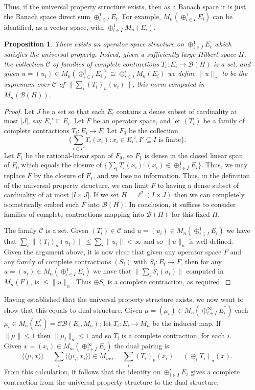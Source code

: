 \documentclass[a4paper,11pt]{article}
\theoremstyle{plain}
\newtheorem{proposition}{Proposition}[section]
\theoremstyle{definition}
\newcommand{\mc}[1]{\mathcal{#1}}
\newcommand{\osip}[2]{\langle\langle{#1},{#2}\rangle\rangle}
\begin{document}
Thus, if the universal property structure exists, then as a Banach space it is just
the Banach space direct sum $\oplus_{i\in I}^1 E_i$.  For example, $M_n(\oplus_{i\in I}^1 E_i)$
can be identified, as a vector space, with $\oplus_{i\in I}^1 M_n(E_i)$.

\begin{proposition}
There exists an operator space structure on $\oplus_{i\in I}^1 E_i$ which satisfies the
universal property.  Indeed, given a sufficiently large Hilbert space $H$, the collection
$\mc C$ of families of complete contractions $T_i:E_i\rightarrow\mc B(H)$ is a set, and
given $u = (u_i) \in M_n(\oplus_{i\in I}^1 E_i) \cong \oplus_{i\in I}^i M_n(E_i)$
we define $\|u\|_n$ to be the supremum over $\mc C$ of $\|\sum_i (T_i)_n(u_i)\|$,
this norm computed in $M_n(\mc B(H))$.
\end{proposition}
\begin{proof}
Let $J$ be a set so that each $E_i$ contains a dense subset of cardinality at most $|J|$,
say $E_i'\subseteq E_i$.
Let $F$ be an operator space, and let $(T_i)$ be a family of complete contractions
$T_i:E_i\rightarrow F$.  Let $F_0$ be the collection
\[ \Big\{ \sum_{i\in I'} T_i(x_i) : x_i\in E_i', I'\subseteq I\text{ is finite} \Big\}. \]
Let $F_1$ be the rational-linear span of $F_0$, so $F_1$ is dense in the closed linear
span of $F_0$ which equals the closure of $\{ \sum_i T_i(x_i) : (x_i)\in \oplus_{i\in I}^1 E_i\}$.  Thus, we may replace $F$ by the closure of $F_1$, and we lose no information.
Thus, in the definition of the universal property
structure, we can limit $F$ to having a dense subset of cardinality of at most $|I\times J|$. 
If we set $H = \ell^2(I\times J)$ then we can completely isometrically embed such $F$ into
$\mc B(H)$.  In conclusion, it suffices to consider families of complete contractions mapping
into $\mc B(H)$ for this fixed $H$.

The family $\mc C$ is a set.  Given $(T_i)\in\mc C$ and $u=(u_i)\in M_n(\oplus_{i\in I}^1 E_i)$
we have that $\sum_i \|(T_i)_n(u_i)\| \leq \sum_i \|u_i\| < \infty$ and so $\|u\|_n$ is
well-defined.  Given the argument above, it is now clear that given any operator space $F$
and any family of complete contractions $(S_i)$ with $S_i:E_i\rightarrow F$, then for any
$u=(u_i)\in M_n(\oplus_{i\in I}^1 E_i)$ we have that $\| \sum_i S_i(u_i) \|$ computed in
$M_n(F)$, is $\leq \|u\|_n$.  Thus $\oplus S_i$ is a complete contraction, as required.
\end{proof}

Having established that the universal property structure exists, we now want to show that
this equals to dual structure.  Given $\mu = (\mu_i) \in M_n(\oplus_{i\in I}^\infty E_i^*)$
each $\mu_i \in M_n(E_i^*) = \mc{CB}(E_i, M_n)$; let $T_i:E_i\rightarrow M_n$ be the
induced map.  If $\|\mu\|\leq 1$ then $\|\mu_i\|_n\leq 1$ and so $T_i$ is a complete
contraction, for each $i$.  Given $x = (x_i) \in M_m(\oplus_{i\in I}^\infty E_i)$ the dual
pairing is
\[ \osip{\mu}{x} = \sum_i \osip{\mu_i}{x_i} \in M_{mn}
= \sum_i (T_i)_n(x_i) = (\oplus_i T_i)_n(x). \]
From this calculation, it follows that the identity on $\oplus_{i\in I}^i E_i$ gives a
complete contraction from the universal property structure to the dual structure.
\end{document}
